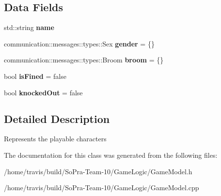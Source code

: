 \subsection*{Data Fields}
\begin{DoxyCompactItemize}
\item 
\hypertarget{classgame_model_1_1_player_a2ec251df1a0164889083c2c4efee89f5}{std\-::string {\bfseries name}}\label{classgame_model_1_1_player_a2ec251df1a0164889083c2c4efee89f5}

\item 
\hypertarget{classgame_model_1_1_player_a6b07ad3fedeec2dfc4854d97118dafa8}{communication\-::messages\-::types\-::\-Sex {\bfseries gender} = \{\}}\label{classgame_model_1_1_player_a6b07ad3fedeec2dfc4854d97118dafa8}

\item 
\hypertarget{classgame_model_1_1_player_ae9ce9fdb6971621553a501c99d12ed6f}{communication\-::messages\-::types\-::\-Broom {\bfseries broom} = \{\}}\label{classgame_model_1_1_player_ae9ce9fdb6971621553a501c99d12ed6f}

\item 
\hypertarget{classgame_model_1_1_player_ad0cbf1657de62c39c4101a9d7f2398c6}{bool {\bfseries is\-Fined} = false}\label{classgame_model_1_1_player_ad0cbf1657de62c39c4101a9d7f2398c6}

\item 
\hypertarget{classgame_model_1_1_player_aa638922565fbdc4044b65467cc8e1d11}{bool {\bfseries knocked\-Out} = false}\label{classgame_model_1_1_player_aa638922565fbdc4044b65467cc8e1d11}

\end{DoxyCompactItemize}


\subsection{Detailed Description}
Represents the playable characters 

The documentation for this class was generated from the following files\-:\begin{DoxyCompactItemize}
\item 
/home/travis/build/\-So\-Pra-\/\-Team-\/10/\-Game\-Logic/Game\-Model.\-h\item 
/home/travis/build/\-So\-Pra-\/\-Team-\/10/\-Game\-Logic/Game\-Model.\-cpp\end{DoxyCompactItemize}
